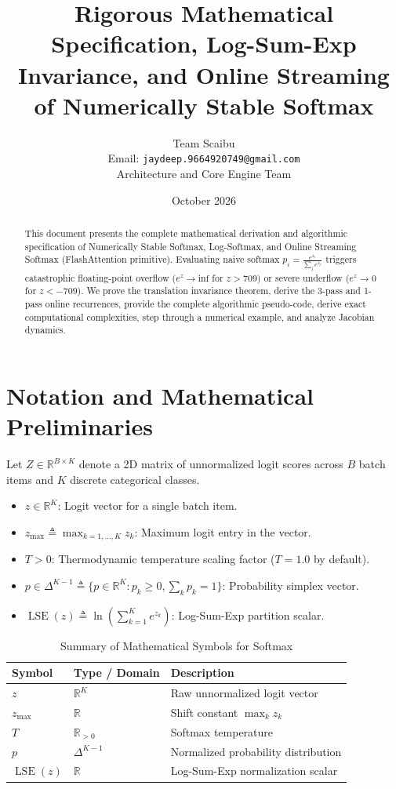 \documentclass[11pt,a4paper]{article}
\title{\textbf{Rigorous Mathematical Specification, Log-Sum-Exp Invariance, and Online Streaming of Numerically Stable Softmax}}
\author{Team Scaibu \\ \small Email: \texttt{jaydeep.9664920749@gmail.com} \\ \small Architecture and Core Engine Team}
\date{October 2026}
\theoremstyle{definition}
\begin{document}
\maketitle

\begin{abstract}
This document presents the complete mathematical derivation and algorithmic specification of Numerically Stable Softmax, Log-Softmax, and Online Streaming Softmax (FlashAttention primitive). Evaluating naive softmax $p_i = \frac{e^{z_i}}{\sum_j e^{z_j}}$ triggers catastrophic floating-point overflow ($e^{z} \to \text{inf}$ for $z > 709$) or severe underflow ($e^z \to 0$ for $z < -709$). We prove the translation invariance theorem, derive the 3-pass and 1-pass online recurrences, provide the complete algorithmic pseudo-code, derive exact computational complexities, step through a numerical example, and analyze Jacobian dynamics.
\end{abstract}

\section{Notation and Mathematical Preliminaries}

Let $Z \in \mathbb{R}^{B \times K}$ denote a 2D matrix of unnormalized logit scores across $B$ batch items and $K$ discrete categorical classes.

\begin{itemize}
    \item $z \in \mathbb{R}^K$: Logit vector for a single batch item.
    \item $z_{\max} \triangleq \max_{k=1, \dots, K} z_k$: Maximum logit entry in the vector.
    \item $T > 0$: Thermodynamic temperature scaling factor ($T = 1.0$ by default).
    \item $p \in \Delta^{K-1} \triangleq \{p \in \mathbb{R}^K : p_k \ge 0, \sum_k p_k = 1\}$: Probability simplex vector.
    \item $\operatorname{LSE}(z) \triangleq \ln \left( \sum_{k=1}^K e^{z_k} \right)$: Log-Sum-Exp partition scalar.
\end{itemize}

\begin{table}[h]
\centering
\caption{Summary of Mathematical Symbols for Softmax}
\begin{tabular}{lll}
\toprule
\textbf{Symbol} & \textbf{Type / Domain} & \textbf{Description} \\
\midrule
$z$ & $\mathbb{R}^K$ & Raw unnormalized logit vector \\
$z_{\max}$ & $\mathbb{R}$ & Shift constant $\max_k z_k$ \\
$T$ & $\mathbb{R}_{> 0}$ & Softmax temperature \\
$p$ & $\Delta^{K-1}$ & Normalized probability distribution \\
$\operatorname{LSE}(z)$ & $\mathbb{R}$ & Log-Sum-Exp normalization scalar \\
\bottomrule
\end{tabular}
\end{table}
\end{document}
